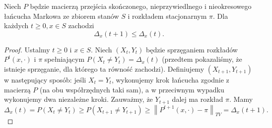 \begin{lemma}[O monotoniczności]
	Niech \(P\) będzie macierzą przejścia skończonego, nieprzywiedlnego i nieokresowego łańcucha Markowa ze zbiorem stanów \(S\) i rozkładem stacjonarnym \(\pi\). Dla każdych \(t\ge 0, x \in S\) zachodzi
	\[ \Delta_x\left( t+1 \right) \le \Delta_x\left( t  \right) . \]
\end{lemma}
\begin{proof}
	Ustalmy \(t\ge 0\) i \(x \in S\). Niech \(\left( X_t,Y_t \right) \) będzie sprzęganiem rozkładów \(P^{t}\left( x,\cdot  \right) \) i \(\pi\) spełniającym \(P\left( X_t \neq Y_t \right) = \Delta_x\left( t  \right) \) (przedtem pokazaliśmy, że istnieje sprzęganie, dla którego ta równość zachodzi). Definiujemy \(\left( X_{t+1},Y_{t+1} \right) \) w następujący sposób: jeśli \(X_t = Y_t\), wykonujemy krok łańcucha zgodnie z macierzą \(P\) (na obu współrzędnych taki sam), a w przeciwnym wypadku wykonujemy dwa niezależne kroki. Zauważmy, że \(Y_{t+1}\) dalej ma rozkład \(\pi\). Mamy
	\[ \Delta_x\left( t  \right) = P\left( X_t \neq Y_t \right) \ge P\left( X_{t+1}\neq Y_{t+1} \right) \ge \left\|P^{t+1}\left( x,\cdot  \right) - \pi \right\|_{TV} = \Delta_x\left( t+1 \right) . \]
\end{proof}

